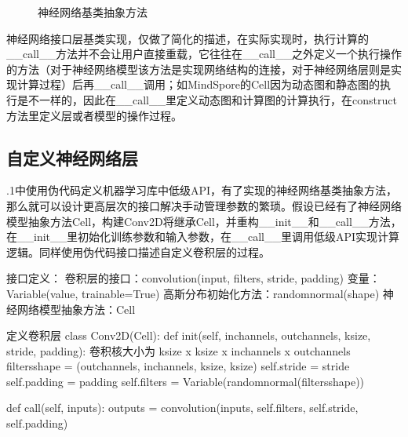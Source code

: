 \documentclass[letterpaper,10pt,english]{sphinxmanual}
\let\sphinxpxdimen\pdfpxdimen\else\newdimen\sphinxpxdimen
\begin{document}
\begin{figure}[H]
\centering
\capstart

\noindent\sphinxincludegraphics[width=800\sphinxpxdimen]{{cell_abstract}.svg}
\caption{神经网络基类抽象方法}\label{\detokenize{chapter_programming_interface/neural_network_layer:id13}}\label{\detokenize{chapter_programming_interface/neural_network_layer:cell-abs}}\end{figure}

\sphinxAtStartPar
神经网络接口层基类实现，仅做了简化的描述，在实际实现时，执行计算的\_\_call\_\_方法并不会让用户直接重载，它往往在\_\_call\_\_之外定义一个执行操作的方法（对于神经网络模型该方法是实现网络结构的连接，对于神经网络层则是实现计算过程）后再\_\_call\_\_调用；如MindSpore的Cell因为动态图和静态图的执行是不一样的，因此在\_\_call\_\_里定义动态图和计算图的计算执行，在construct方法里定义层或者模型的操作过程。


\subsection{自定义神经网络层}
\label{\detokenize{chapter_programming_interface/neural_network_layer:id4}}
.1中使用伪代码定义机器学习库中低级API，有了实现的神经网络基类抽象方法，那么就可以设计更高层次的接口解决手动管理参数的繁琐。假设已经有了神经网络模型抽象方法Cell，构建Conv2D将继承Cell，并重构\_\_init\_\_和\_\_call\_\_方法，在\_\_init\_\_里初始化训练参数和输入参数，在\_\_call\_\_里调用低级API实现计算逻辑。同样使用伪代码接口描述自定义卷积层的过程。

\begin{sphinxVerbatim}[commandchars=\\\{\}]
\PYGZsh{} 接口定义：
卷积层的接口：convolution(input, filters, stride, padding)
变量：Variable(value, trainable=True)
高斯分布初始化方法：random\PYGZus{}normal(shape)
神经网络模型抽象方法：Cell

\PYGZsh{} 定义卷积层
class Conv2D(Cell):
    def \PYGZus{}\PYGZus{}init\PYGZus{}\PYGZus{}(self, in\PYGZus{}channels, out\PYGZus{}channels, ksize, stride, padding):
        \PYGZsh{} 卷积核大小为 ksize x ksize x inchannels x out\PYGZus{}channels
        filters\PYGZus{}shape = (out\PYGZus{}channels, in\PYGZus{}channels, ksize, ksize)
        self.stride = stride
        self.padding = padding
        self.filters = Variable(random\PYGZus{}normal(filters\PYGZus{}shape))

    def \PYGZus{}\PYGZus{}call\PYGZus{}\PYGZus{}(self, inputs):
        outputs = convolution(inputs, self.filters, self.stride, self.padding)
\end{sphinxVerbatim}
\end{document}
